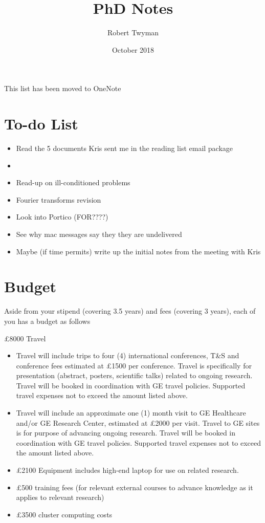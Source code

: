 \documentclass{article}
\title{PhD Notes}
\author{Robert Twyman}
\date{October 2018}
\begin{document}
\maketitle
This list has been moved to OneNote


\section{To-do List}

\begin{itemize}
\item Read the 5 documents Kris sent me in the reading list email package
\item 
\item Read-up on ill-conditioned problems
\item Fourier transforms revision
\item Look into Portico (FOR????)
\end{itemize}

\begin{itemize}
\item See why mac messages say they they are undelivered  
\end{itemize}






\begin{itemize}
\item Maybe (if time permits) write up the initial notes from the meeting with Kris
\end{itemize}

\section{Budget}
Aside from your stipend (covering 3.5 years) and fees (covering 3 years), each of you has a budget as follows
 
£8000 Travel
\begin{itemize}
\item Travel will include trips to four (4) international conferences, T\&S and conference fees estimated at £1500 per conference. Travel is specifically for presentation (abstract, posters, scientific talks) related to ongoing research. Travel will be booked in coordination with GE travel policies. Supported travel expenses not to exceed the amount listed above.
\item Travel will include an approximate one (1) month visit to GE Healthcare and/or GE Research Center, estimated at £2000 per visit. Travel to GE sites is for purpose of advancing ongoing research. Travel will be booked in coordination with GE travel policies. Supported travel expenses not to exceed the amount listed above.
\item £2100 Equipment includes high-end laptop for use on related research.
\item £500 training fees (for relevant external courses to advance knowledge as it applies to relevant research)
\item £3500 cluster computing costs
\end{itemize}
\end{document}
